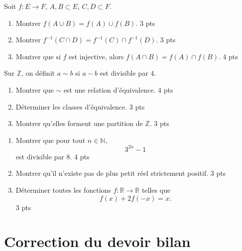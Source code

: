\documentclass[11pt,a4paper]{article}
\newcommand{\N}{\mathbb{N}}
\newcommand{\Z}{\mathbb{Z}}
\newcommand{\R}{\mathbb{R}}
\begin{document}
\begin{exercicebox}
Soit \(f:E\to F\), \(A,B\subset E\), \(C,D\subset F\).
\begin{enumerate}
    \item Montrer \(f(A\cup B)=f(A)\cup f(B)\). \hfill 3 pts
    \item Montrer \(f^{-1}(C\cap D)=f^{-1}(C)\cap f^{-1}(D)\). \hfill 3 pts
    \item Montrer que si \(f\) est injective, alors \(f(A\cap B)=f(A)\cap f(B)\). \hfill 4 pts
\end{enumerate}
\end{exercicebox}

\begin{exercicebox}
Sur \(\Z\), on définit \(a\sim b\) si \(a-b\) est divisible par \(4\).
\begin{enumerate}
    \item Montrer que \(\sim\) est une relation d'équivalence. \hfill 4 pts
    \item Déterminer les classes d'équivalence. \hfill 3 pts
    \item Montrer qu'elles forment une partition de \(\Z\). \hfill 3 pts
\end{enumerate}
\end{exercicebox}

\begin{exercicebox}
\begin{enumerate}
    \item Montrer que pour tout \(n\in\N\),
    \[
    3^{2n}-1
    \]
    est divisible par \(8\). \hfill 4 pts
    \item Montrer qu'il n'existe pas de plus petit réel strictement positif. \hfill 3 pts
    \item Déterminer toutes les fonctions \(f:\R\to\R\) telles que
    \[
    f(x)+2f(-x)=x.
    \]
    \hfill 3 pts
\end{enumerate}
\end{exercicebox}

\newpage

\section{Correction du devoir bilan}
\end{document}
